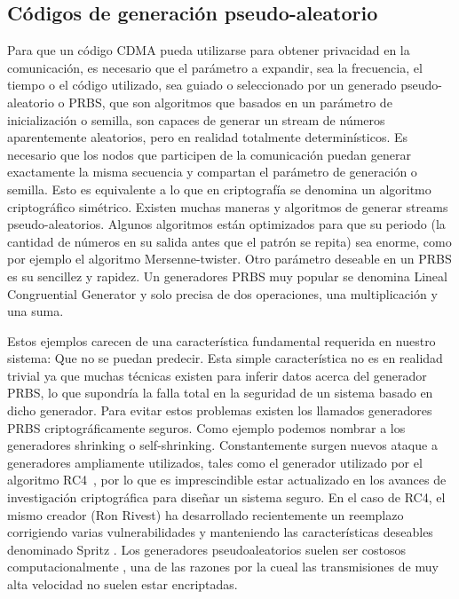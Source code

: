 \subsection{Códigos de generación pseudo-aleatorio}
\label{PRNGs} 
Para que un código CDMA pueda utilizarse para obtener privacidad en la comunicación, es necesario que el parámetro a expandir, sea la frecuencia, el tiempo o el código utilizado, sea guiado o seleccionado por un generado pseudo-aleatorio o PRBS, que son algoritmos que basados en un parámetro de inicialización o semilla, son capaces de generar un stream de números aparentemente aleatorios, pero en realidad totalmente determinísticos. 
Es necesario que los nodos que participen de la comunicación puedan generar exactamente la misma secuencia y compartan el parámetro de generación o semilla. Esto es equivalente a lo que en criptografía se denomina un algoritmo criptográfico simétrico.
Existen muchas maneras y algoritmos de generar streams pseudo-aleatorios. Algunos algoritmos están optimizados para que su periodo (la cantidad de números en su salida antes que el patrón se repita) sea enorme, como por ejemplo el algoritmo Mersenne-twister.
Otro parámetro deseable en un PRBS es su sencillez y rapidez. Un generadores PRBS muy popular se denomina Lineal Congruential Generator y solo precisa de dos operaciones, una multiplicación y una suma.

Estos ejemplos carecen de una característica fundamental requerida en nuestro sistema: Que no se puedan predecir. Esta simple característica no es en realidad trivial ya que muchas técnicas existen para inferir datos acerca del generador PRBS, lo que supondría la falla total en la seguridad de un sistema basado en dicho generador. Para evitar estos problemas existen los llamados generadores PRBS criptográficamente seguros. Como ejemplo podemos nombrar a los generadores shrinking o self-shrinking.
Constantemente surgen nuevos ataque a generadores ampliamente utilizados, tales como el generador utilizado por el algoritmo RC4~\cite{vaudenay2007passive}, por lo que es imprescindible estar actualizado en los avances de investigación criptográfica para diseñar un sistema seguro. En el caso de RC4, el mismo creador (Ron Rivest) ha desarrollado recientemente un reemplazo corrigiendo varias vulnerabilidades y manteniendo las características deseables denominado Spritz \cite{RC14}. Los generadores pseudoaleatorios suelen ser costosos computacionalmente , una de las razones por la cueal las transmisiones de muy alta velocidad no suelen estar encriptadas.


